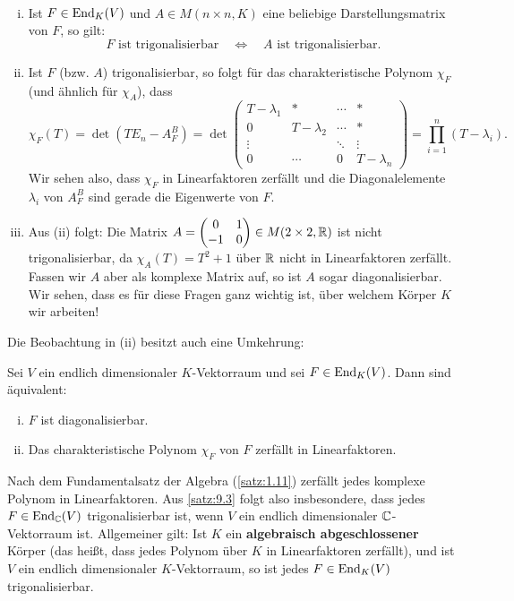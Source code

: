 \begin{bemerkung}
	\mbox{} \\[-1.4cm]
	\label{bem:9.2}
	\begin{enumerate}[(i)]
		\item Ist $F \in \operatorname{End}_K(V)$ und $A \in M(n \times n,K)$ eine beliebige Darstellungsmatrix von $F$, so gilt:
		\[
			F \text{ ist trigonalisierbar} \quad \Leftrightarrow \quad A \text{ ist trigonalisierbar.}
		\]
		\item Ist $F$ (bzw. $A$) trigonalisierbar, so folgt für das charakteristische Polynom $\chi_F$ (und ähnlich für $\chi_A$), dass
		\[
			\chi_F(T) = \det(TE_n-A_F^B) = \det \begin{pmatrix}
			T-\lambda_1 & * & \cdots & * \\ 
			0 & T-\lambda_2 & \cdots & * \\ 
			\vdots &  & \ddots & \vdots \\ 
			0 & \cdots & 0 & T-\lambda_n
			\end{pmatrix} = \prod\limits_{i=1}^{n} (T-\lambda_i).
		\]
		Wir sehen also, dass $\chi_F$ in Linearfaktoren zerfällt und die Diagonalelemente $\lambda_i$ von $A^B_F$ sind gerade die Eigenwerte von $F$.
		\item Aus (ii) folgt:
		Die Matrix $A = \begin{pmatrix}
			0 & 1 \\ -1 & 0
		\end{pmatrix} \in M(2 \times 2,\mathbb{R})$ ist nicht trigonalisierbar, da $\chi_A(T) = T^2 +1$ über $\mathbb{R}$ nicht in Linearfaktoren zerfällt.
		Fassen wir $A$ aber als komplexe Matrix auf, so ist $A$ sogar diagonalisierbar.
		Wir sehen, dass es für diese Fragen ganz wichtig ist, über welchem Körper $K$ wir arbeiten!
	\end{enumerate}
\end{bemerkung}
\newpage
Die Beobachtung in (ii) besitzt auch eine Umkehrung:

\begin{satz}
	\label{satz:9.3}
	Sei $V$ ein endlich dimensionaler $K$-Vektorraum und sei $F \in \operatorname{End}_K(V)$.
	Dann sind äquivalent:
	\begin{enumerate}[(i)]
		\item	$F$ ist diagonalisierbar.
		\item Das charakteristische Polynom $\chi_F$ von $F$ zerfällt in Linearfaktoren.
	\end{enumerate}
\end{satz}

\begin{bemerkung}
	\label{bem:9.4}
	Nach dem Fundamentalsatz der Algebra (\autoref{satz:1.11}) zerfällt jedes komplexe Polynom in Linearfaktoren.
	Aus \autoref{satz:9.3} folgt also insbesondere, dass jedes $F \in \operatorname{End}_{\mathbb{C}}(V)$ trigonalisierbar ist, wenn $V$ ein endlich dimensionaler $\mathbb{C}$-Vektorraum ist.
	Allgemeiner gilt:
	Ist $K$ ein \textbf{algebraisch abgeschlossener} Körper (das heißt, dass jedes Polynom über $K$ in Linearfaktoren zerfällt), und ist $V$ ein endlich dimensionaler $K$-Vektorraum, so ist jedes $F \in \operatorname{End}_K(V)$ trigonalisierbar. 
\end{bemerkung}

